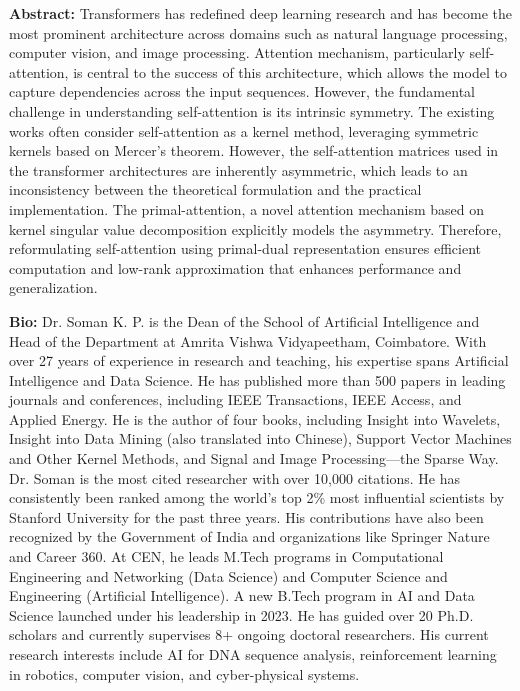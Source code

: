 \documentclass[11pt,oneside]{book}
\begin{document}
  \vspace*{0.2cm}
    \textbf{Abstract:} Transformers has redefined deep learning research and has become the most prominent architecture across domains such as natural language processing, computer vision, and image processing. Attention mechanism, particularly self-attention, is central to the success of this architecture, which allows the model to capture dependencies across the input sequences. However, the fundamental challenge in understanding self-attention is its intrinsic symmetry. The existing works often consider self-attention as a kernel method, leveraging symmetric kernels based on Mercer's theorem. However, the self-attention matrices used in the transformer architectures are inherently asymmetric, which leads to an inconsistency between the theoretical formulation and the practical implementation. The primal-attention, a novel attention mechanism based on kernel singular value decomposition explicitly models the asymmetry. Therefore, reformulating self-attention using primal-dual representation ensures efficient computation and low-rank approximation that enhances performance and generalization. 
\\
  \newline
  
    \textbf{Bio:} Dr. Soman K. P. is the Dean of the School of Artificial Intelligence and Head of the Department at Amrita Vishwa Vidyapeetham, Coimbatore. With over 27 years of experience in research and teaching, his expertise spans Artificial Intelligence and Data Science. He has published more than 500 papers in leading journals and conferences, including IEEE Transactions, IEEE Access, and Applied Energy. He is the author of four books, including Insight into Wavelets, Insight into Data Mining (also translated into Chinese), Support Vector Machines and Other Kernel Methods, and Signal and Image Processing—the Sparse Way. Dr. Soman is the most cited researcher with over 10,000 citations. He has consistently been ranked among the world’s top 2\% most influential scientists by Stanford University for the past three years. His contributions have also been recognized by the Government of India and organizations like Springer Nature and Career 360. At CEN, he leads M.Tech programs in Computational Engineering and Networking (Data Science) and Computer Science and Engineering (Artificial Intelligence). A new B.Tech program in AI and Data Science launched under his leadership in 2023. He has guided over 20 Ph.D. scholars and currently supervises 8+ ongoing doctoral researchers. His current research interests include AI for DNA sequence analysis, reinforcement learning in robotics, computer vision, and cyber-physical systems.
  \newpage
  
\end{document}
